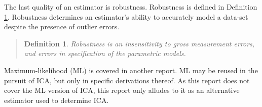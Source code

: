 \documentclass[11pt]{article}
\newtheorem{adef}[thm]{Definition}
\begin{document}
The last quality of an estimator is robustness.  Robustness is defined in Definition \ref{robustnessDefinition}.  Robustness determines an estimator's ability to accurately model a data-set despite the presence of outlier errors.  
\begin{quote}
	\begin{adef}
	\label{robustnessDefinition}
	Robustness is an insensitivity to gross measurement errors, and errors in specification of the parametric models.	
	\end{adef}
	\cite[83]{appo-ica-book}
\end{quote}

Maximum-likelihood (ML)  is covered in another report.  ML may be reused in the pursuit of ICA, but only in specific derivations thereof.  As this report does not cover the ML version of ICA, this report only alludes to it as an alternative estimator used to determine ICA. 

\end{document}
